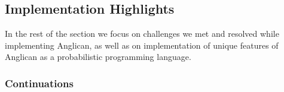 \documentclass[preprint]{sigplanconf}
\begin{document}
\subsection{Implementation Highlights}
\label{seq:highlights}

\iftoggle{full}{%
So far we introduced the basics of Anglican compilation to
Clojure. The described approaches and techniques are important
for grasping the language implementation but relatively well-known.
}{%
Anglican compilation to Clojure is based on CPS transformation
and compilation techniques, many of which are
well known and widely used~\cite{AJ89,A07}.
}%
In the rest of the section we focus on challenges we met and
resolved while implementing Anglican, as well as on
implementation of unique features of Anglican as a probabilistic
programming language.

\subsubsection{Continuations}
\label{seq:continuations}
\end{document}
